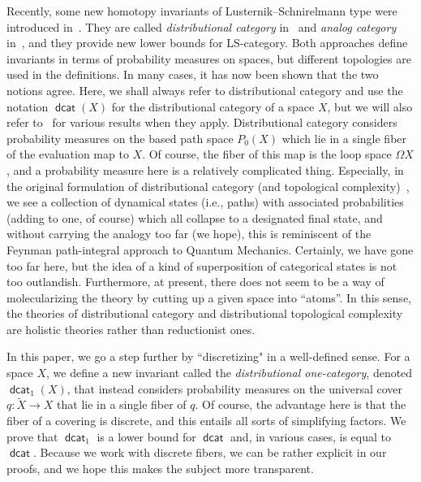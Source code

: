 \documentclass[amscd,amssymb,verbatim,11pt]{amsart}
\theoremstyle{plain}
\theoremstyle{definition}
\DeclareMathOperator{\dcat}{{\mathsf{dcat}}}
\begin{document}
Recently, some new homotopy invariants of Lusternik--Schnirelmann type were introduced in~\cite{DJ,KW}. 
They are called \emph{distributional category} in~\cite{DJ} and \emph{analog category} in~\cite{KW},
and they provide new lower bounds for LS-category. Both approaches define invariants in terms 
of probability measures on spaces, but different topologies are used in the definitions. 
In many cases, it has now been shown that the two notions agree. Here, we shall always refer to 
distributional category and use the notation $\dcat(X)$ for the distributional category of a space $X$, but we will also refer to~\cite{KW} for various results when they apply. 
Distributional category considers probability measures on the based path
space $P_0(X)$ which lie in a single fiber of the evaluation map to $X$. Of course, 
the fiber of this map is the loop space $\Omega X$, and a probability measure here is a relatively complicated thing. Especially, in the original formulation of 
distributional category (and topological complexity)~\cite{DJ,Ja1}, we see a collection of
dynamical states (i.e., paths) with associated probabilities (adding to one, of course) 
which all collapse to a designated final state, and without carrying the analogy
too far (we hope), this is reminiscent of the Feynman path-integral approach to
Quantum Mechanics. Certainly, we have gone too far here, but the idea of a kind
of superposition of categorical states is not too outlandish. Furthermore, 
at present, there does not seem to be a way of molecularizing the theory by
cutting up a given space into ``atoms''. In this sense, the theories of distributional category
and distributional topological complexity are holistic theories rather than reductionist ones.

In this paper, we go a step further by ``discretizing" in a well-defined sense. 
For a space $X$, we define a new invariant called the \emph{distributional one-category}, 
denoted $\dcat_1(X)$, that instead considers
probability measures on the universal cover $q\colon \widetilde X \to X$ that 
lie in a single fiber of $q$. Of course, the advantage here is that the fiber of a covering is discrete, and this 
entails all sorts of simplifying factors. We prove
that $\dcat_1$ is a lower bound for $\dcat$ and, in various cases, is equal 
to $\dcat$. Because we work with 
discrete fibers, we can be rather explicit in our proofs, and we hope this 
makes the subject more transparent.
\end{document}
